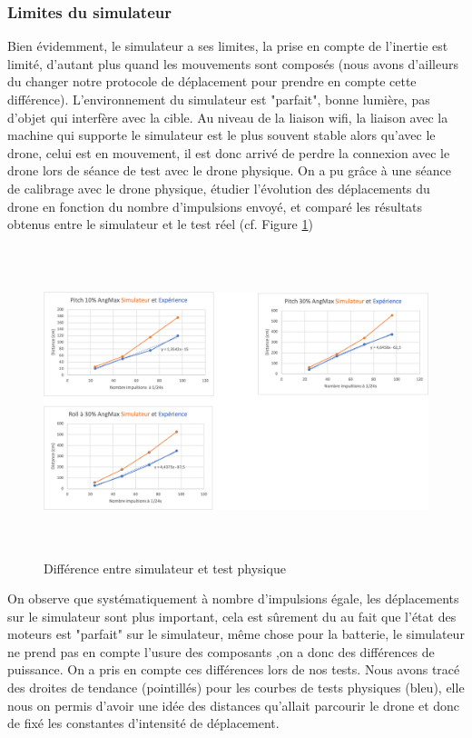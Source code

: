 \documentclass[12pt]{article}
\begin{document}
\subsubsection{Limites du simulateur}
Bien évidemment, le simulateur a ses limites, la prise en compte de l'inertie est limité, d'autant plus quand les mouvements sont composés (nous avons d'ailleurs du changer notre protocole de déplacement pour prendre en compte cette différence). L'environnement du simulateur est "parfait", bonne lumière, pas d'objet qui interfère avec la cible. Au niveau de la liaison wifi, la liaison avec la machine qui supporte le simulateur est le plus souvent stable alors qu'avec le drone, celui est en mouvement, il est donc arrivé de perdre la connexion avec le drone lors de séance de test avec le drone physique.
On a pu grâce à une séance de calibrage avec le drone physique, étudier l'évolution des déplacements du drone en fonction du nombre d'impulsions envoyé, et comparé les résultats obtenus entre le simulateur et le test réel (cf. Figure \ref{fig:diffsimu}) 

\begin{figure}[H]
\centering
\includegraphics[height=9cm]{DiffSimu.png}
\caption{Différence entre simulateur et test physique}
\label{fig:diffsimu}
\end{figure}

On observe que systématiquement à nombre d'impulsions égale, les déplacements sur le simulateur sont plus important, cela est sûrement du au fait que l'état des moteurs est "parfait" sur le simulateur, même chose pour la batterie, le simulateur ne prend pas en compte l'usure des composants ,on a donc des différences de puissance. On a pris en compte ces différences lors de nos tests. Nous avons tracé des droites de tendance (pointillés) pour les courbes de tests physiques (bleu), elle nous on permis d'avoir une idée des distances qu'allait parcourir le drone et donc de fixé les constantes d'intensité de déplacement. 
\end{document}
